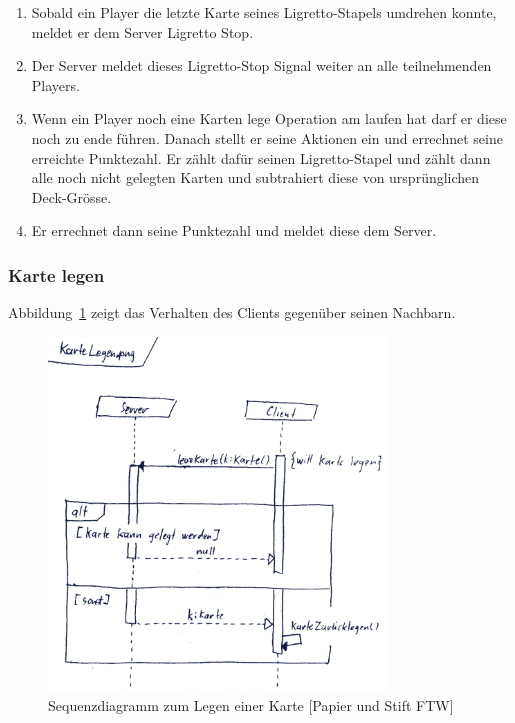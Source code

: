 \begin{enumerate}
	\item Sobald ein Player die letzte Karte seines Ligretto-Stapels umdrehen konnte, meldet er dem Server Ligretto Stop. 
	\item Der Server meldet dieses Ligretto-Stop Signal weiter an alle teilnehmenden Players.
	\item Wenn ein Player noch eine Karten lege Operation am laufen hat darf er diese noch zu ende führen. Danach stellt er seine Aktionen ein und errechnet seine erreichte Punktezahl. Er zählt dafür seinen Ligretto-Stapel und zählt dann alle noch nicht gelegten Karten und subtrahiert diese von ursprünglichen Deck-Grösse.
	\item Er errechnet dann seine Punktezahl und meldet diese dem Server.
\end{enumerate}

\subsubsection{Karte legen}

Abbildung~\ref{SequenzdiagramClient} zeigt das Verhalten des Clients gegenüber seinen Nachbarn.

\begin{figure}[H]
  \centering
  \includegraphics[width=0.80\textwidth,angle=0]{graphics/KarteLegen.png}
  \caption{Sequenzdiagramm zum Legen einer Karte [Papier und Stift FTW] \hfill{} }
   \label{SequenzdiagramClient}
 \end{figure}
 
